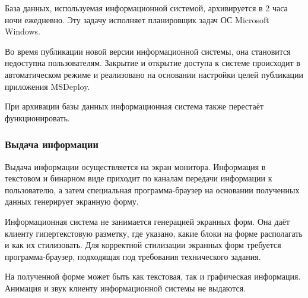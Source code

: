 База данных, используемая информационной системой, архивируется в 2 часа ночи ежедневно.
Эту задачу исполняет планировщик задач ОС Microsoft Windows.

Во время публикации новой версии информационной системы, она становится недоступна пользователям.
Закрытие и открытие доступа к системе происходит в автоматическом режиме и реализовано на основании настройки целей публикации приложения MSDeploy.

При архивации базы данных информационная система также перестаёт функционировать.

\subsubsection{Выдача информации}

Выдача информации осуществляется на экран монитора.
Информация в текстовом и бинарном виде приходит по каналам передачи информации к пользователю, а затем специальная программа-браузер на основании полученных данных генерирует экранную форму.

Информационная система не занимается генерацией экранных форм.
Она даёт клиенту гипертекстовую разметку, где указано, какие блоки на форме располагать и как их стилизовать.
Для корректной стилизации экранных форм требуется программа-браузер, подходящая под требования технического задания.

На полученной форме может быть как текстовая, так и графическая информация. Анимация и звук клиенту информационной системы не выдаются.

\clearpage
\newpage